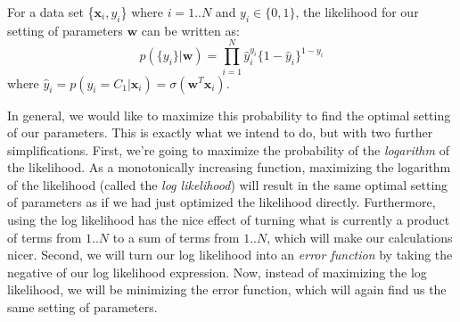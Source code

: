 For a data set \{$\textbf{x}_{i}, y_{i}$\} where $i = 1..N$ and $y_{i} \in \{0,1\}$, the likelihood for our setting of parameters $\textbf{w}$ can be written as:
\begin{equation} \label{log-reg-likelihood}
	p(\{y_{i}\}|\textbf{w}) = \prod_{i=1}^{N} \hat{y}_{i}^{y_{i}} \{1 - \hat{y}_{i}\}^{1 - y_{i}}
\end{equation}
where $\hat{y}_{i} = p(y_{i}=C_{1}|\textbf{x}_{i}) = \sigma(\textbf{w}^{T}\textbf{x}_{i})$.

In general, we would like to maximize this probability to find the optimal setting of our parameters. This is exactly what we intend to do, but with two further simplifications. First, we're going to maximize the probability of the \textit{logarithm} of the likelihood. As a monotonically increasing function, maximizing the logarithm of the likelihood (called the \textit{log likelihood}) will result in the same optimal setting of parameters as if we had just optimized the likelihood directly. Furthermore, using the log likelihood has the nice effect of turning what is currently a product of terms from $1..N$ to a sum of terms from $1..N$, which will make our calculations nicer. Second, we will turn our log likelihood into an \textit{error function} by taking the negative of our log likelihood expression. Now, instead of maximizing the log likelihood, we will be minimizing the error function, which will again find us the same setting of parameters.



